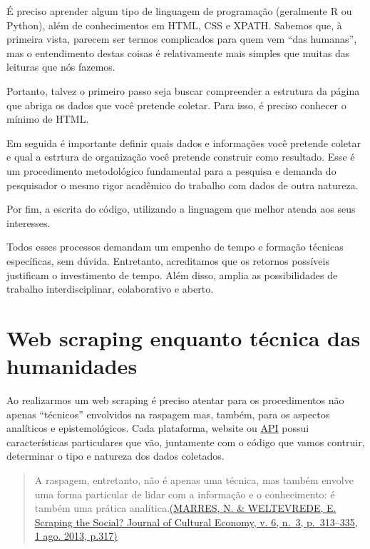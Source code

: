 \documentclass[
]{book}
\begin{document}
É preciso aprender algum tipo de linguagem de programação (geralmente R ou Python), além de conhecimentos em HTML, CSS e XPATH. Sabemos que, à primeira vista, parecem ser termos complicados para quem vem ``das humanas'', mas o entendimento destas coisas é relativamente mais simples que muitas das leituras que nós fazemos.

Portanto, talvez o primeiro passo seja buscar compreender a estrutura da página que abriga os dados que você pretende coletar. Para isso, é preciso conhecer o mínimo de HTML.

Em seguida é importante definir quais dados e informações você pretende coletar e qual a estrtura de organização você pretende construir como resultado. Esse é um procedimento metodológico fundamental para a pesquisa e demanda do pesquisador o mesmo rigor acadêmico do trabalho com dados de outra natureza.

Por fim, a escrita do código, utilizando a linguagem que melhor atenda aos seus interesses.

Todos esses processos demandam um empenho de tempo e formação técnicas específicas, sem dúvida. Entretanto, acreditamos que os retornos possíveis justificam o investimento de tempo. Além disso, amplia as possibilidades de trabalho interdisciplinar, colaborativo e aberto.

\hypertarget{web-scraping-enquanto-tuxe9cnica-das-humanidades}{%
\section{Web scraping enquanto técnica das humanidades}\label{web-scraping-enquanto-tuxe9cnica-das-humanidades}}

Ao realizarmos um web scraping é preciso atentar para os procedimentos não apenas ``técnicos'' envolvidos na raspagem mas, também, para os aspectos analíticos e epistemológicos. Cada plataforma, website ou \href{https://canaltech.com.br/software/o-que-e-api/}{API} possui características particulares que vão, juntamente com o código que vamos contruir, determinar o tipo e natureza dos dados coletados.

\begin{quote}
A raspagem, entretanto, não é apenas uma técnica, mas também envolve uma forma particular de lidar com a informação e o conhecimento: é também uma prática analítica.\href{https://www.tandfonline.com/doi/abs/10.1080/17530350.2013.772070}{(MARRES, N. \& WELTEVREDE, E. Scraping the Social? Journal of Cultural Economy, v. 6, n.~3, p.~313--335, 1 ago. 2013, p.317)}
\end{quote}
\end{document}
